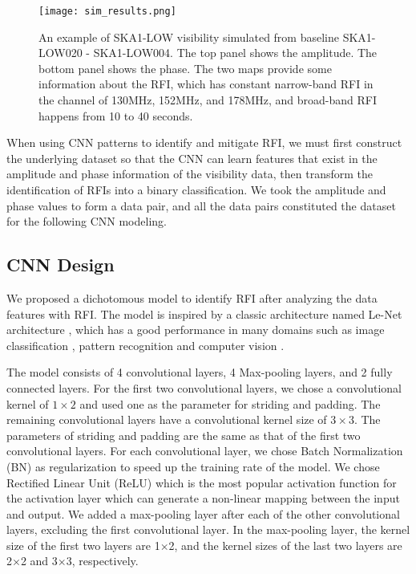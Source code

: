 \documentclass[usenatbib]{mnras}
\begin{document}
\begin{figure}
\begin{center}
	\texttt{[image: sim\_results.png]}
\end{center}
    \caption{An example of SKA1-LOW visibility simulated from baseline SKA1-LOW020 - SKA1-LOW004. The top panel shows the amplitude. The bottom panel shows the phase. The two maps provide some information about the RFI, which has constant narrow-band RFI in the channel of 130MHz, 152MHz, and 178MHz, and broad-band RFI happens from 10 to 40 seconds.}
    \label{fig:RFI}
\end{figure}

When using CNN patterns to identify and mitigate RFI, we must first construct the underlying dataset so that the CNN can learn features that exist in the amplitude and phase information of the visibility data, then transform the identification of RFIs into a binary classification. We took the amplitude and phase values to form a data pair, and all the data pairs constituted the dataset for the following CNN modeling.

\subsection{CNN Design}


We proposed a dichotomous model to identify RFI after analyzing the data features with RFI. The model is inspired by a classic architecture named Le-Net architecture  \citep{lecun1998gradient}, which has a good performance in many domains such as image classification \citep{el2016cnn} , pattern recognition \citep{yuan2012offline} and computer vision \citep{xie2016disturblabel}. 

The model consists of 4 convolutional layers, 4 Max-pooling layers, and 2 fully connected layers.
For the first two convolutional layers, we chose a convolutional kernel of $1\times2$ and used one as the parameter for striding and padding. The remaining convolutional layers have a convolutional kernel size of $3\times3$. The parameters of striding and padding are the same as that of the first two convolutional layers. For each convolutional layer, we chose Batch Normalization (BN) \citep{DBLP:journals/corr/IoffeS15} as regularization to speed up the training rate of the model. We chose Rectified Linear Unit (ReLU) \citep{10.5555/3104322.3104425} which is the most popular activation function for the activation layer which can generate a non-linear mapping between the input and output.
We added a max-pooling layer after each of the other convolutional layers, excluding the first convolutional layer. In the max-pooling layer, the kernel size of the first two layers are 1$\times$2, and the kernel sizes of the last two layers are 2$\times$2 and 3$\times$3, respectively.
\end{document}
